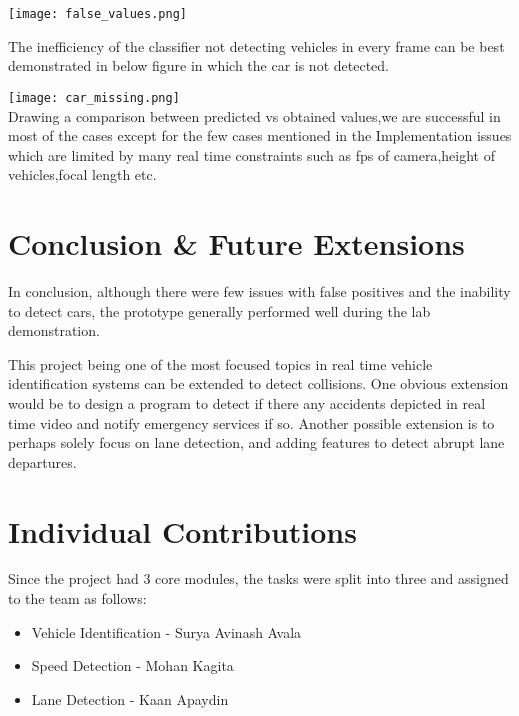 \documentclass[conference]{IEEEtran}
\begin{document}
\texttt{[image: false\_values.png]}

The inefficiency of the classifier not detecting vehicles in every frame can be best demonstrated in below figure in which the car is not detected.


\texttt{[image: car\_missing.png]} \\

Drawing a comparison between predicted vs obtained values,we are successful in most of the cases except for the few cases mentioned in the Implementation issues which are limited by many real time constraints such as fps of camera,height of vehicles,focal length etc. \\ 
\section{Conclusion \& Future Extensions}

In conclusion, although there were few issues with false positives and the inability to detect cars, the prototype generally performed well during the lab demonstration.

This project being one of the most focused topics in real time vehicle identification systems can be extended to detect collisions. One obvious extension would be to design a program to detect if there any accidents depicted in real time video and notify emergency services if so. Another possible extension is to perhaps solely focus on lane detection, and adding features to detect abrupt lane departures.

\section{Individual Contributions}

Since the project had 3 core modules, the tasks were split into three and assigned to the team as follows:
\begin{itemize}
\item Vehicle Identification - Surya Avinash Avala
\item Speed Detection - Mohan Kagita
\item Lane Detection - Kaan Apaydin
\end{itemize} 
\end{document}
